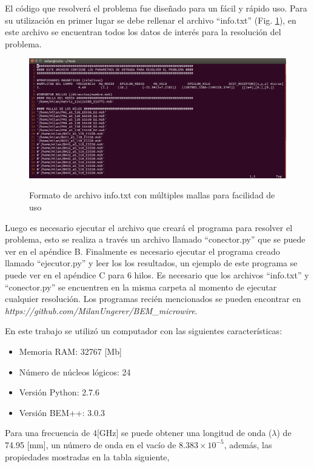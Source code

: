 \documentclass[12pt,letterpaper]{article}
\numberwithin{equation}{section}
\begin{document}
El código que resolverá el problema fue diseñado para un fácil y rápido uso. Para su utilización en primer lugar se debe rellenar el archivo ``info.txt'' (Fig. \ref{fig:infotxt}), en este archivo se encuentran todos los datos de interés para la resolución del problema.

\begin{figure}[H]
	\centering\includegraphics[scale=0.42]{Imagenes/infotxt.png}\\
	\caption{Formato de archivo info.txt con múltiples mallas para facilidad de uso}
	\label{fig:infotxt}
\end{figure} 

\pagebreak
Luego es necesario ejecutar el archivo que creará el programa para resolver el problema, esto se realiza a través un archivo llamado ``conector.py'' que se puede ver en el apéndice B. Finalmente es necesario ejecutar el programa creado llamado ``ejecutor.py'' y leer los los resultados, un ejemplo de este programa se puede ver en el apéndice C para 6 hilos. Es necesario que los archivos ``info.txt'' y ``conector.py'' se encuentren en la misma carpeta al momento de ejecutar cualquier resolución. Los programas recién mencionados se pueden encontrar en \textit{https://github.com/MilanUngerer/BEM\_microwire}.

En este trabajo se utilizó un computador con las siguientes características:
\begin{itemize}
	\item Memoria RAM: 32767 [Mb]
	\item Número de núcleos lógicos: 24
	\item Versión Python: 2.7.6
	\item Versión BEM++: 3.0.3
\end{itemize}

Para una frecuencia de 4[GHz] se puede obtener una longitud de onda ($\lambda$) de 74.95 [mm], un número de onda en el vacío de $8.383\times10^{-5}$, además, las propiedades mostradas en la tabla siguiente,\\
\end{document}
